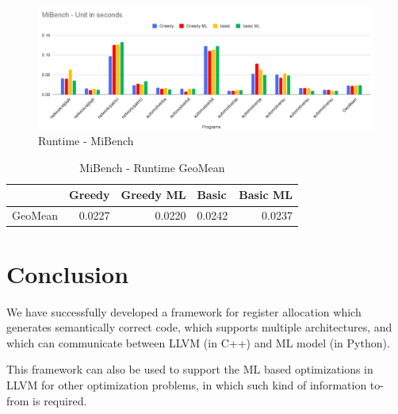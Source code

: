 \begin{figure}[t]
    \centering
    \includegraphics[scale=0.4]{figures/chapter-5/MiBench.png}
    \caption{Runtime - MiBench}
     \label{fig:mlra-mibench}
\end{figure}

\begin{table}[h]
\begin{tabular}{|l|l|l|l|l|}
\hline
 & \textbf{Greedy} & \textbf{Greedy ML} & \textbf{Basic} & \textbf{Basic ML} \\ \hline
GeoMean & \multicolumn{1}{r|}{0.0227} & \multicolumn{1}{r|}{0.0220} & \multicolumn{1}{r|}{0.0242} & \multicolumn{1}{r|}{0.0237} \\ \hline
\end{tabular}
\centering
\caption{MiBench - Runtime GeoMean}
\label{tab:mlra:mibench}
\end{table}


\section{Conclusion}\label{sec:mlra:conclusion}
We have successfully developed a framework for register allocation which generates semantically correct code, which supports multiple architectures, and which can communicate between LLVM (in C++) and ML model (in Python).

This framework can also be used to support the ML based optimizations in LLVM for other optimization problems, in which such kind of information to-from is required.
